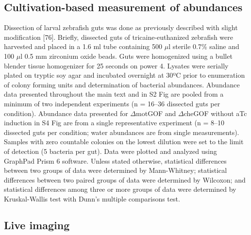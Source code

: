 \subsection{Cultivation-based measurement of abundances}

Dissection of larval zebrafish guts was done as previously described with slight modification [76]. Briefly, dissected guts of tricaine-euthanized zebrafish were harvested and placed in a 1.6 ml tube containing 500 $\mu$l sterile 0.7\% saline and 100 $\mu$l 0.5 mm zirconium oxide beads. Guts were homogenized using a bullet blender tissue homogenizer for 25 seconds on power 4. Lysates were serially plated on tryptic soy agar and incubated overnight at 30ºC prior to enumeration of colony forming units and determination of bacterial abundances. Abundance data presented throughout the main text and in S2 Fig are pooled from a minimum of two independent experiments (n = 16–36 dissected guts per condition). Abundance data presented for $\Delta$motGOF and $\Delta$cheGOF without aTc induction in S4 Fig are from a single representative experiment (n = 8–10 dissected guts per condition; water abundances are from single measurements). Samples with zero countable colonies on the lowest dilution were set to the limit of detection (5 bacteria per gut). Data were plotted and analyzed using GraphPad Prism 6 software. Unless stated otherwise, statistical differences between two groups of data were determined by Mann-Whitney; statistical differences between two paired groups of data were determined by Wilcoxon; and statistical differences among three or more groups of data were determined by Kruskal-Wallis test with Dunn's multiple comparisons test.  

\subsection{Live imaging}

